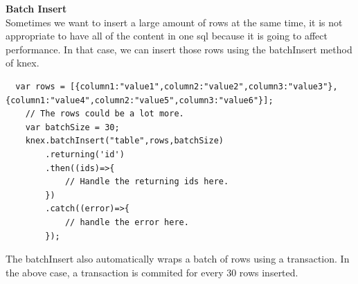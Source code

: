 \documentclass[a4paper]{article}
\begin{document}
\textbf{Batch Insert}\\
Sometimes we want to insert a large amount of rows at the same time, it is not appropriate to have all of the content in one sql because it is going to affect performance. In that case, we can insert those rows using the batchInsert method of knex.
\begin{lstlisting}
  var rows = [{column1:"value1",column2:"value2",column3:"value3"},{column1:"value4",column2:"value5",column3:"value6"}];
    // The rows could be a lot more.
    var batchSize = 30;
    knex.batchInsert("table",rows,batchSize)
        .returning('id')
        .then((ids)=>{
            // Handle the returning ids here.
        })
        .catch((error)=>{
            // handle the error here.
        });
\end{lstlisting}
The batchInsert also automatically wraps a batch of rows using a transaction. In the above case, a transaction is commited for every 30 rows inserted.\\
\end{document}
